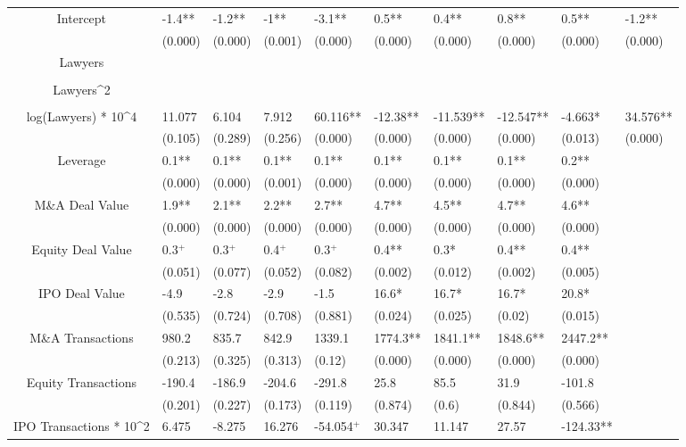 \documentclass{article}
\begin{document}
\begin{table}[H]
\begin{tabular}{|clllllllll|}
Intercept & -1.4** & -1.2** & -1** & -3.1** & 0.5** & 0.4** & 0.8** & 0.5** & -1.2** \\ 
   & (0.000) & (0.000) & (0.001) & (0.000) & (0.000) & (0.000) & (0.000) & (0.000) & (0.000) \\ 
  Lawyers &  &  &  &  &  &  &  &  &  \\ 
   &  &  &  &  &  &  &  &  &  \\ 
  Lawyers^2 &  &  &  &  &  &  &  &  &  \\ 
   &  &  &  &  &  &  &  &  &  \\ 
  log(Lawyers) * 10^4 & 11.077 & 6.104 & 7.912 & 60.116** & -12.38** & -11.539** & -12.547** & -4.663* & 34.576** \\ 
   & (0.105) & (0.289) & (0.256) & (0.000) & (0.000) & (0.000) & (0.000) & (0.013) & (0.000) \\ 
  Leverage & 0.1** & 0.1** & 0.1** & 0.1** & 0.1** & 0.1** & 0.1** & 0.2** &  \\ 
   & (0.000) & (0.000) & (0.001) & (0.000) & (0.000) & (0.000) & (0.000) & (0.000) &  \\ 
  M\&A Deal Value & 1.9** & 2.1** & 2.2** & 2.7** & 4.7** & 4.5** & 4.7** & 4.6** &  \\ 
   & (0.000) & (0.000) & (0.000) & (0.000) & (0.000) & (0.000) & (0.000) & (0.000) &  \\ 
  Equity Deal Value & 0.3$^{+}$ & 0.3$^{+}$ & 0.4$^{+}$ & 0.3$^{+}$ & 0.4** & 0.3* & 0.4** & 0.4** &  \\ 
   & (0.051) & (0.077) & (0.052) & (0.082) & (0.002) & (0.012) & (0.002) & (0.005) &  \\ 
  IPO Deal Value & -4.9 & -2.8 & -2.9 & -1.5 & 16.6* & 16.7* & 16.7* & 20.8* &  \\ 
   & (0.535) & (0.724) & (0.708) & (0.881) & (0.024) & (0.025) & (0.02) & (0.015) &  \\ 
  M\&A Transactions & 980.2 & 835.7 & 842.9 & 1339.1 & 1774.3** & 1841.1** & 1848.6** & 2447.2** &  \\ 
   & (0.213) & (0.325) & (0.313) & (0.12) & (0.000) & (0.000) & (0.000) & (0.000) &  \\ 
  Equity Transactions & -190.4 & -186.9 & -204.6 & -291.8 & 25.8 & 85.5 & 31.9 & -101.8 &  \\ 
   & (0.201) & (0.227) & (0.173) & (0.119) & (0.874) & (0.6) & (0.844) & (0.566) &  \\ 
  IPO Transactions * 10^2 & 6.475 & -8.275 & 16.276 & -54.054$^{+}$ & 30.347 & 11.147 & 27.57 & -124.33** &  \\ 

\end{tabular}
\end{table}
\end{document}

